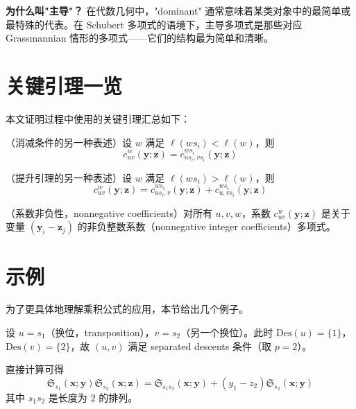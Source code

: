 \textbf{为什么叫"主导"？} 在代数几何中，"dominant" 通常意味着某类对象中的最简单或最特殊的代表。在 Schubert 多项式的语境下，主导多项式是那些对应 Grassmannian 情形的多项式——它们的结构最为简单和清晰。

\section{关键引理一览}
\label{sec:KeyLemmas}

本文证明过程中使用的关键引理汇总如下：

\begin{Lemma}
\label{eq:Lemma41}
（消减条件的另一种表述）设 $w$ 满足 $\ell(ws_i) < \ell(w)$，则
\begin{equation}
c_{uv}^w(\mathbf{y}; \mathbf{z}) = c_{us_i, vs_i}^{ws_i}(\mathbf{y}; \mathbf{z})
\end{equation}
\end{Lemma}

\begin{Lemma}
\label{eq:Lemma42}
（提升引理的另一种表述）设 $w$ 满足 $\ell(ws_i) > \ell(w)$，则
\begin{equation}
c_{uv}^w(\mathbf{y}; \mathbf{z}) = c_{us_i, v}^{ws_i}(\mathbf{y}; \mathbf{z}) + c_{u, vs_i}^{ws_i}(\mathbf{y}; \mathbf{z})
\end{equation}
\end{Lemma}

\begin{Lemma}
\label{eq:Lemma48}
（系数非负性，nonnegative coefficients）对所有 $u, v, w$，系数 $c_{uv}^w(\mathbf{y}; \mathbf{z})$ 是关于变量 $(\mathbf{y}_i - \mathbf{z}_j)$ 的非负整数系数（nonnegative integer coefficients）多项式。
\end{Lemma}

\section{示例}
\label{sec:Examples}

为了更具体地理解乘积公式的应用，本节给出几个例子。

\begin{Example}[例 8.1：基本情形]
设 $u = s_1$（换位，transposition），$v = s_2$（另一个换位）。此时 $\mathrm{Des}(u) = \{1\}$，$\mathrm{Des}(v) = \{2\}$，故 $(u, v)$ 满足 separated descents 条件（取 $p = 2$）。

直接计算可得
\begin{equation}
\mathfrak{S}_{s_1}(\mathbf{x}; \mathbf{y}) \mathfrak{S}_{s_2}(\mathbf{x}; \mathbf{z}) = \mathfrak{S}_{s_1s_2}(\mathbf{x}; \mathbf{y}) + (y_1 - z_2) \mathfrak{S}_{s_2}(\mathbf{x}; \mathbf{y})
\label{eq:Example8-1}
\end{equation}
其中 $s_1s_2$ 是长度为 2 的排列。
\end{Example}

